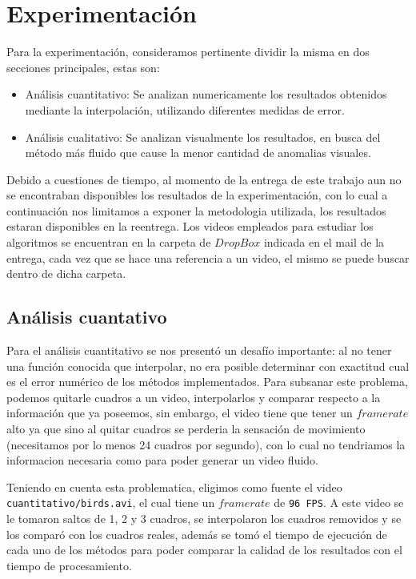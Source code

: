 \section{Experimentación}

Para la experimentación, consideramos pertinente dividir la misma en dos secciones principales, estas son:

\begin{itemize}
	\item Análisis cuantitativo: Se analizan numericamente los resultados obtenidos mediante la interpolación, utilizando diferentes medidas de error.
	\item Análisis cualitativo: Se analizan visualmente los resultados, en busca del método más fluido que cause la menor cantidad de anomalias visuales.
\end{itemize}

Debido a cuestiones de tiempo, al momento de la entrega de este trabajo aun no se encontraban disponibles los resultados de la experimentación, con lo cual a continuación nos limitamos a exponer la metodologia utilizada, los resultados estaran disponibles en la reentrega. Los videos empleados para estudiar los algoritmos se encuentran en la carpeta de $DropBox$ indicada en el mail de la entrega, cada vez que se hace una referencia a un video, el mismo se puede buscar dentro de dicha carpeta.

\subsection{Análisis cuantativo}

Para el análisis cuantitativo se nos presentó un desafío importante: al no tener una función conocida que interpolar, no era posible determinar con exactitud cual es el error numérico de los métodos implementados. Para subsanar este problema, podemos quitarle cuadros a un video, interpolarlos y comparar respecto a la información que ya poseemos, sin embargo, el video tiene que tener un $framerate$ alto ya que sino al quitar cuadros se perderia la sensación de movimiento (necesitamos por lo menos 24 cuadros por segundo), con lo cual no tendriamos la informacion necesaria como para poder generar un video fluido.

Teniendo en cuenta esta problematica, eligimos como fuente el video \texttt{cuantitativo/birds.avi}, el cual tiene un $framerate$ de \texttt{96 FPS}. A este video se le tomaron saltos de 1, 2 y 3 cuadros, se interpolaron los cuadros removidos y se los comparó con los cuadros reales, además se tomó el tiempo de ejecución de cada uno de los métodos para poder comparar la calidad de los resultados con el tiempo de procesamiento.

